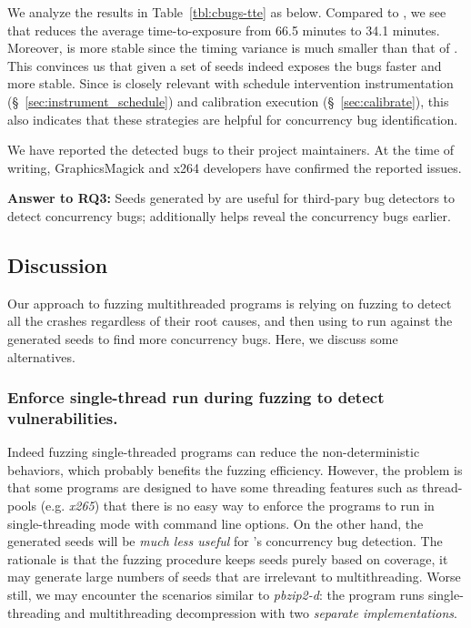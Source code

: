 We analyze the results in Table~\ref{tbl:cbugs-tte} as below. Compared to , we 
see that  reduces the average time-to-exposure from 66.5 minutes to 34.1 minutes. 
Moreover,  is more stable since the timing variance is much smaller than that of 
. This convinces us that given a set of seeds  indeed exposes the bugs 
faster and more stable. Since  is closely relevant with schedule intervention 
instrumentation (\S~\ref{sec:instrument_schedule}) and calibration execution (\S~\ref{sec:calibrate}),
this also indicates that these strategies are helpful for concurrency bug identification.

We have reported the detected bugs to their project maintainers. At the time of writing, 
GraphicsMagick and x264 developers have confirmed the reported issues.

\begin{tcolorbox}[size=title]
{\textbf{Answer to RQ3: } Seeds generated by \mtfuzz are useful for third-pary bug detectors 
to detect concurrency bugs; \NcalTrace additionally helps reveal the concurrency bugs earlier.}
\end{tcolorbox}


\subsection{Discussion}\label{sec:tsan_issues}

Our approach to fuzzing multithreaded programs is relying on fuzzing to detect all the crashes regardless of their root causes, and then using \ts to run against the generated seeds to find more concurrency bugs. Here, we discuss some alternatives.

\subsubsection{Enforce single-thread run during fuzzing to detect vulnerabilities.}\label{sec:discuss_st_vul}
Indeed fuzzing single-threaded programs can reduce the non-deterministic behaviors, which probably benefits the fuzzing efficiency. However, the problem is that some programs are designed to have some threading features such as thread-pools (e.g. \emph{x265}) that there is no easy way to enforce the programs to run in single-threading mode with command line options. On the other hand, the generated seeds will be \emph{much less useful} for \ts's concurrency bug detection. The rationale is that the fuzzing procedure keeps seeds purely based on coverage, it may generate large numbers of seeds that are irrelevant to multithreading. Worse still, we may encounter the scenarios similar to \emph{pbzip2-d}: the program runs single-threading and multithreading decompression with two \emph{separate implementations}.

